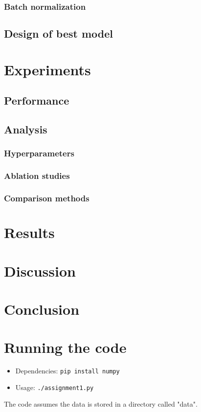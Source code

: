\documentclass{article}
\begin{document}
\subsubsection{Batch normalization}
\subsection{Design of best model}

\section{Experiments}
\subsection{Performance}
\subsection{Analysis}
\subsubsection{Hyperparameters}
\subsubsection{Ablation studies}
\subsubsection{Comparison methods}

\section{Results}

\section{Discussion}

\section{Conclusion}

\appendix
\section{Running the code}
\begin{itemize}
\item Dependencies: \texttt{pip install numpy}
\item Usage: \texttt{./assignment1.py}
\end{itemize}
The code assumes the data is stored in a directory called "data".
\end{document}
